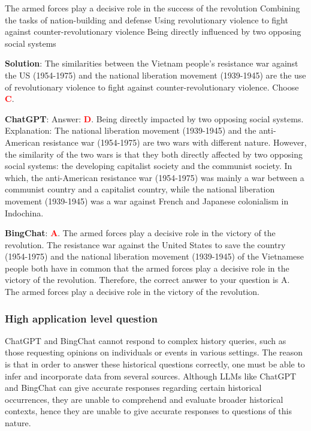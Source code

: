 \documentclass{article}
\begin{document}
{\begin{mdframed}[linewidth=1pt,linecolor=red]
		\begin{choices}
			\choice The armed forces play a decisive role in the success of the revolution
			\choice Combining the tasks of nation-building and defense
			\choice Using revolutionary violence to fight against counter-revolutionary violence
			\choice Being directly influenced by two opposing social systems
		\end{choices}
		
		\textbf{Solution}: The similarities between the Vietnam people's resistance war against the US (1954-1975) and the national liberation movement (1939-1945) are the use of revolutionary violence to fight against counter-revolutionary violence. Choose \textcolor{red}{\textbf{C}}.
		
		\textbf{ChatGPT}: Answer: \textcolor{red}{\textbf{D}}. Being directly impacted by two opposing social systems. Explanation: The national liberation movement (1939-1945) and the anti-American resistance war (1954-1975) are two wars with different nature. However, the similarity of the two wars is that they both directly affected by two opposing social systems: the developing capitalist society and the communist society. In which, the anti-American resistance war (1954-1975) was mainly a war between a communist country and a capitalist country, while the national liberation movement (1939-1945) was a war against French and Japanese colonialism in Indochina.  
		
		\textbf{BingChat}: \textcolor{red}{\textbf{A}}. The armed forces play a decisive role in the victory of the revolution. The resistance war against the United States to save the country (1954-1975) and the national liberation movement (1939-1945) of the Vietnamese people both have in common that the armed forces play a decisive role in the victory of the revolution. Therefore, the correct answer to your question is A. The armed forces play a decisive role in the victory of the revolution.
		
	\end{mdframed}
	
	
	\subsubsection{High application level question}
	\label{VNHSGE_His_H}
	
	ChatGPT and BingChat cannot respond to complex history queries, such as those requesting opinions on individuals or events in various settings. The reason is that in order to answer these historical questions correctly, one must be able to infer and incorporate data from several sources. Although LLMs like ChatGPT and BingChat can give accurate responses regarding certain historical occurrences, they are unable to comprehend and evaluate broader historical contexts, hence they are unable to give accurate responses to questions of this nature.
	
}
\end{document}

